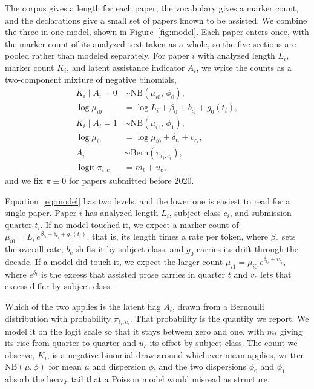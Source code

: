 \documentclass[twocolumn]{aastex631}
\begin{document}
The corpus gives a length for each paper, the vocabulary gives a marker count, and the declarations give a small set of papers known to be assisted. We combine the three in one model, shown in Figure~\ref{fig:model}. Each paper enters once, with the marker count of its analyzed text taken as a whole, so the five sections are pooled rather than modeled separately. For paper $i$ with analyzed length $L_i$, marker count $K_i$, and latent assistance indicator $A_i$, we write the counts as a two-component mixture of negative binomials,
\begin{align}
K_i \mid A_i{=}0 &\sim \mathrm{NB}(\mu_{i0},\,\phi_0),\nonumber\\
\log\mu_{i0} &= \log L_i + \beta_0 + b_{c_i} + g_0(t_i),\nonumber\\
K_i \mid A_i{=}1 &\sim \mathrm{NB}(\mu_{i1},\,\phi_1),\nonumber\\
\log\mu_{i1} &= \log\mu_{i0} + \delta_{t_i} + v_{c_i},\nonumber\\
A_i &\sim \mathrm{Bern}(\pi_{t_i,c_i}),\nonumber\\
\operatorname{logit}\pi_{t,c} &= m_t + u_c,
\label{eq:model}
\end{align}
and we fix $\pi\equiv0$ for papers submitted before 2020.

Equation~\ref{eq:model} has two levels, and the lower one is easiest to read for a single paper. Paper $i$ has analyzed length $L_i$, subject class $c_i$, and submission quarter $t_i$. If no model touched it, we expect a marker count of $\mu_{i0} = L_i\,e^{\beta_0 + b_{c_i} + g_0(t_i)}$, that is, its length times a rate per token, where $\beta_0$ sets the overall rate, $b_c$ shifts it by subject class, and $g_0$ carries its drift through the decade. If a model did touch it, we expect the larger count $\mu_{i1} = \mu_{i0}\,e^{\delta_{t_i} + v_{c_i}}$, where $e^{\delta_t}$ is the excess that assisted prose carries in quarter $t$ and $v_c$ lets that excess differ by subject class.

Which of the two applies is the latent flag $A_i$, drawn from a Bernoulli distribution with probability $\pi_{t_i,c_i}$. That probability is the quantity we report. We model it on the logit scale so that it stays between zero and one, with $m_t$ giving its rise from quarter to quarter and $u_c$ its offset by subject class. The count we observe, $K_i$, is a negative binomial draw around whichever mean applies, written $\mathrm{NB}(\mu,\phi)$ for mean $\mu$ and dispersion $\phi$, and the two dispersions $\phi_0$ and $\phi_1$ absorb the heavy tail that a Poisson model would misread as structure.
\end{document}
